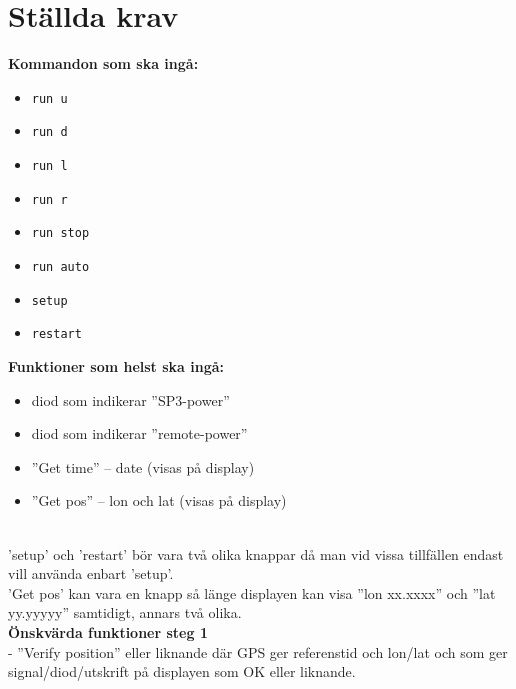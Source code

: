 \documentclass{article}
\begin{document}
		\section*{Ställda krav} %
		\label{sub:stallda_krav}

			\begin{minipage}[t]{0.5\textwidth}
			\noindent \textbf{Kommandon som ska ingå:}
				\begin{itemize}
					\item \texttt{run u}
					\item \texttt{run d}
					\item \texttt{run l}
					\item \texttt{run r}
					\item \texttt{run stop}
					\item \texttt{run auto}
					\item \texttt{setup}
					\item \texttt{restart }
				\end{itemize}
			\end{minipage}
			\begin{minipage}[t]{0.5\textwidth}
				\noindent \textbf{Funktioner som helst ska ingå:}
				\begin{itemize}
					\item  diod som indikerar ”SP3-power”
					\item  diod som indikerar ”remote-power”
					\item  ”Get time” -- date (visas på display)
					\item  ”Get pos” -- lon och lat (visas på display)
				\end{itemize}
			\end{minipage} \\

			\vspace{2mm}\noindent 'setup' och 'restart' bör vara två olika knappar då man vid vissa tillfällen endast vill använda enbart 'setup'.\\

			\noindent 'Get pos' kan vara en knapp så länge displayen kan visa ''lon xx.xxxx'' och ''lat yy.yyyyy'' samtidigt, annars två olika. \\

			\noindent \textbf{Önskvärda funktioner steg 1} \\
			-	”Verify position” eller liknande där GPS ger referenstid och lon/lat och som ger signal/diod/utskrift på displayen som OK eller liknande. \\
\end{document}
